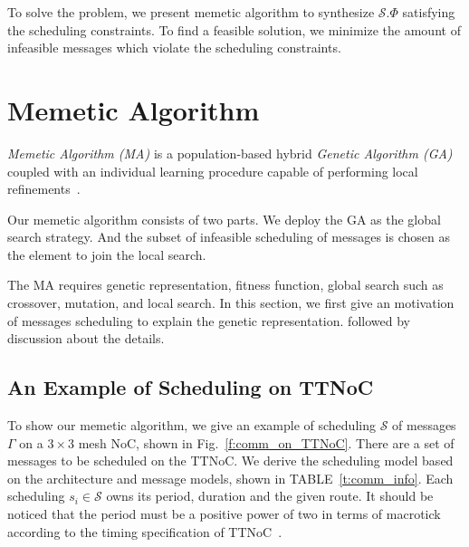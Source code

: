 \documentclass[journal]{IEEEtran}
\newcommand{\calS}{\mathcal{S}}
\theoremstyle{remark}
\begin{document}
To solve the problem, we present memetic algorithm to synthesize
$\calS.\Phi$ satisfying the scheduling constraints. 
To find a feasible solution,
 we minimize the amount of infeasible messages which violate the scheduling constraints.



\section{Memetic Algorithm \label{s:algorithm}}
\emph{Memetic Algorithm (MA)} is a population-based hybrid
\emph{Genetic Algorithm (GA)} coupled with an individual learning
procedure capable of performing local refinements~\cite{DBLP:journals/cim/OngLC10}.

Our memetic algorithm consists of two parts. We deploy the GA as the global search strategy.
And the subset of infeasible scheduling of messages is chosen as the element to join the local search.

The MA requires genetic representation,
 fitness function,
  global search such as crossover, mutation,
   and local search. 
In this section, we first give an motivation of messages scheduling to explain the genetic representation.
followed by discussion about the details.

  \subsection{An Example of Scheduling on TTNoC}
To show our memetic algorithm,
 we give an example of scheduling $\calS$ of messages $\Gamma$ on a $3\times 3$ mesh NoC,
 shown in Fig.~\ref{f:comm_on_TTNoC}. 
There are a set of messages to be scheduled on the TTNoC.
We derive the scheduling model based on the architecture and message models,
 shown in TABLE~\ref{t:comm_info}.
Each scheduling $s_i\in\calS$ owns its period, duration and the given route.
It should be noticed that the period must be a positive power of two in terms of macrotick according to the timing specification of TTNoC~\cite{DBLP:conf/date/HuangBRBK12}.
\end{document}
